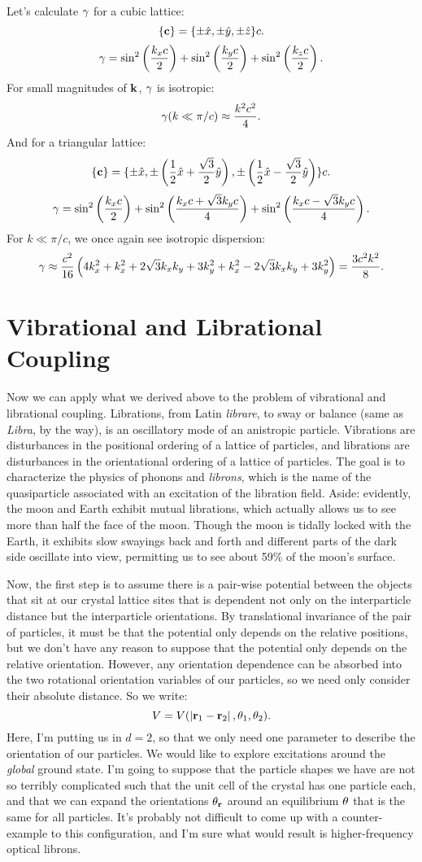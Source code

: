 \documentclass[12pt]{article}
\begin{document}
Let's calculate $\gamma$ for a cubic lattice:
\[ \{\mathbf{c}\} = \{\pm \hat x, \pm \hat y,\pm \hat z\} c.\]
\[ \gamma = \sin^2\left(\frac{k_xc}{2}\right) + 
\sin^2\left(\frac{k_yc}{2}\right)+\sin^2\left(\frac{k_zc}{2}\right).\]
For small magnitudes of $\mathbf{k}$, $\gamma$ is isotropic:
\[ \gamma(k \ll \pi/c) \approx \frac{k^2c^2}{4}.\]
And for a triangular lattice:
\[ \{\mathbf{c}\} = \{\pm \hat x,\pm \left(\frac{1}{2}\hat x + \frac{\sqrt 3}{2} \hat y\right),\pm \left( \frac{1}{2} \hat x - \frac{\sqrt 3}{2} \hat y\right)\}c.\]
\[ \gamma = \sin^2\left(\frac{k_x c}{2}\right) + \sin^2\left(\frac{k_x c + \sqrt 3 k_y 
c}{4}\right) + \sin^2 \left(\frac{ k_x c - \sqrt 3 k_y c}{4}\right).\]
For $k \ll \pi/c$, we once again see isotropic dispersion:
\[ \gamma \approx \frac{c^2}{16}\left(4k_x^2 + k_x^2 + 2\sqrt 3 k_x k_y + 3 k_y^2 
+ k_x^2 - 2\sqrt 3 k_x k_y + 3 k_y^2\right) = \frac{3 c^2 k^2}{8}.\]

\section{Vibrational and Librational Coupling}
Now we can apply what we derived above to the problem of vibrational and librational coupling. Librations, from Latin \emph{librare}, to sway  or balance (same as \emph{Libra}, by the way), is an oscillatory mode of an anistropic particle. Vibrations are disturbances in the positional ordering of a lattice of particles, and librations are disturbances in the orientational ordering of a lattice of particles. The goal is to characterize the physics of phonons and \emph{librons}, which is the name of the quasiparticle associated with an excitation of the libration field. Aside: evidently, the moon and Earth exhibit mutual librations, which actually allows us to see more than half the face of the moon. Though the moon is tidally locked with the Earth, it exhibits slow swayings back and forth and different parts of the dark side oscillate into view, permitting us to see about 59\% of the moon's surface. 


Now, the first step is to assume there is a pair-wise potential between the objects that sit at our crystal lattice sites that is dependent not only on the interparticle distance but the interparticle orientations. By translational invariance of the pair of particles, it must be that the potential only depends on the relative positions, but we don't have any reason to suppose that the potential only depends on the relative orientation. However, any orientation dependence can be absorbed into the two rotational orientation variables of our particles, so we need only consider their absolute distance. So we write:
\[ V = V(\left | \mathbf{r}_1 - \mathbf{r}_2 \right |,\theta_1,\theta_2).\]
Here, I'm putting us in $d=2$, so that we only need one parameter to describe the orientation of our particles. We would like to explore excitations around the \emph{global} ground state. I'm going to suppose that the particle shapes we have are not so terribly complicated such that the unit cell of the crystal has one particle each, and that we can expand the orientations $\theta_{\mathbf{r}}$ around an equilibrium $\theta$ that is the same for all particles. It's probably not difficult to come up with a counter-example to this configuration, and I'm sure what would result is higher-frequency optical librons.
\end{document}
